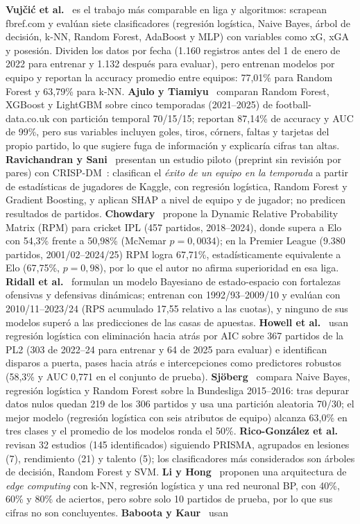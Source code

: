 \documentclass{ieeeaccess}
\begin{document}
\textbf{Vujčić et al.}~\cite{vujcic2026supervised} es el trabajo más comparable en liga y algoritmos: scrapean fbref.com y evalúan siete clasificadores (regresión logística, Naive Bayes, árbol de decisión, k-NN, Random Forest, AdaBoost y MLP) con variables como xG, xGA y posesión. Dividen los datos por fecha (1.160 registros antes del 1 de enero de 2022 para entrenar y 1.132 después para evaluar), pero entrenan modelos por equipo y reportan la accuracy promedio entre equipos: 77,01\% para Random Forest y 63,79\% para k-NN. \textbf{Ajulo y Tiamiyu}~\cite{ajulo2026ml} comparan Random Forest, XGBoost y LightGBM sobre cinco temporadas (2021--2025) de football-data.co.uk con partición temporal 70/15/15; reportan 87,14\% de accuracy y AUC de 99\%, pero sus variables incluyen goles, tiros, córners, faltas y tarjetas del propio partido, lo que sugiere fuga de información y explicaría cifras tan altas. \textbf{Ravichandran y Sani}~\cite{ravichandran2026framework} presentan un estudio piloto (preprint sin revisión por pares) con CRISP-DM~\cite{wirth2000crisp}: clasifican el \textit{éxito de un equipo en la temporada} a partir de estadísticas de jugadores de Kaggle, con regresión logística, Random Forest y Gradient Boosting, y aplican SHAP a nivel de equipo y de jugador; no predicen resultados de partidos. \textbf{Chowdary}~\cite{chowdary2026dynamic} propone la Dynamic Relative Probability Matrix (RPM) para cricket IPL (457 partidos, 2018--2024), donde supera a Elo con 54,3\% frente a 50,98\% (McNemar $p=0{,}0034$); en la Premier League (9.380 partidos, 2001/02--2024/25) RPM logra 67,71\%, estadísticamente equivalente a Elo (67,75\%, $p=0{,}98$), por lo que el autor no afirma superioridad en esa liga. \textbf{Ridall et al.}~\cite{ridall2025bayesian} formulan un modelo Bayesiano de estado-espacio con fortalezas ofensivas y defensivas dinámicas; entrenan con 1992/93--2009/10 y evalúan con 2010/11--2023/24 (RPS acumulado 17,55 relativo a las cuotas), y ninguno de sus modelos superó a las predicciones de las casas de apuestas. \textbf{Howell et al.}~\cite{howell2026winning} usan regresión logística con eliminación hacia atrás por AIC sobre 367 partidos de la PL2 (303 de 2022--24 para entrenar y 64 de 2025 para evaluar) e identifican disparos a puerta, pases hacia atrás e intercepciones como predictores robustos (58,3\% y AUC 0,771 en el conjunto de prueba). \textbf{Sjöberg}~\cite{sjoborg2023football} compara Naive Bayes, regresión logística y Random Forest sobre la Bundesliga 2015--2016: tras depurar datos nulos quedan 219 de los 306 partidos y usa una partición aleatoria 70/30; el mejor modelo (regresión logística con seis atributos de equipo) alcanza 63,0\% en tres clases y el promedio de los modelos ronda el 50\%. \textbf{Rico-González et al.}~\cite{ricogonzalez2023ml} revisan 32 estudios (145 identificados) siguiendo PRISMA, agrupados en lesiones (7), rendimiento (21) y talento (5); los clasificadores más considerados son árboles de decisión, Random Forest y SVM. \textbf{Li y Hong}~\cite{li2022football} proponen una arquitectura de \textit{edge computing} con k-NN, regresión logística y una red neuronal BP, con 40\%, 60\% y 80\% de aciertos, pero sobre solo 10 partidos de prueba, por lo que sus cifras no son concluyentes. \textbf{Baboota y Kaur}~\cite{baboota2019predictive} usan 
\end{document}
